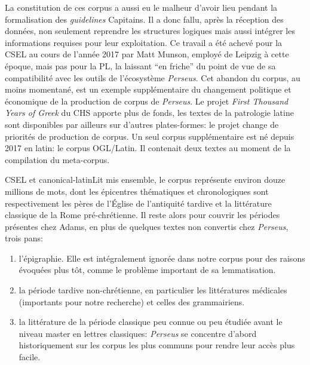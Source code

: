 La constitution de ces corpus a aussi eu le malheur d'avoir lieu pendant la formalisation des \textit{guidelines} Capitains. Il a donc fallu, après la réception des données, non seulement reprendre les structures logiques mais aussi intégrer les informations requises pour leur exploitation. Ce travail a été achevé pour la CSEL au cours de l'année 2017 par Matt Munson, employé de Leipzig à cette époque, mais pas pour la PL, la laissant \enquote{en friche} du point de vue de sa compatibilité avec les outils de l'écosystème \textit{Perseus}. Cet abandon du corpus, au moins momentané, est un exemple supplémentaire du changement politique et économique de la production de corpus de \textit{Perseus}. Le projet \textit{First Thousand Years of Greek} du CHS apporte plus de fonds, les textes de la patrologie latine sont disponibles par ailleurs sur d'autres plates-formes: le projet change de priorités de production de corpus. Un seul corpus supplémentaire est né depuis 2017 en latin: le corpus OGL/Latin. Il contenait deux textes au moment de la compilation du meta-corpus.

CSEL et canonical-latinLit mis ensemble, le corpus représente environ douze millions de mots, dont les épicentres thématiques et chronologiques sont respectivement les pères de l'Église de l'antiquité tardive et la littérature classique de la Rome pré-chrétienne. Il reste alors pour couvrir les périodes présentes chez Adams, en plus de quelques textes non convertis chez \textit{Perseus}, trois pans:

\begin{enumerate}
    \item l'épigraphie. Elle est intégralement ignorée dans notre corpus pour des raisons évoquées plus tôt, comme le problème important de sa lemmatisation.
    \item la période tardive non-chrétienne, en particulier les littératures médicales (importants pour notre recherche) et celles des grammairiens.
    \item la littérature de la période classique peu connue ou peu étudiée avant le niveau master en lettres classiques: \textit{Perseus} se concentre d'abord historiquement sur les corpus les plus communs pour rendre leur accès plus facile. 
\end{enumerate}

